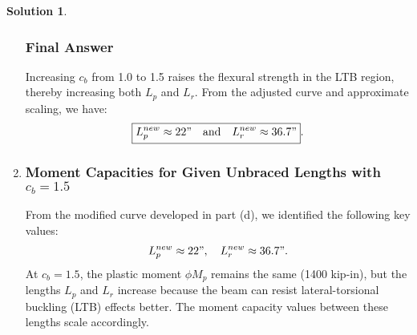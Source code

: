 \documentclass[12pt]{article}
\theoremstyle{definition} %
\newtheorem{solution}{Solution}
\theoremstyle{plain} %
\begin{document}
\begin{solution}
\begin{enumerate}
    


\subsubsection*{Final Answer}
Increasing $ c_b $ from 1.0 to 1.5 raises the flexural strength in the LTB region, thereby increasing both $ L_p $ and $ L_r $. From the adjusted curve and approximate scaling, we have:
\begin{align}
\boxed{L_p^{new} \approx 22" \quad\text{and}\quad L_r^{new} \approx 36.7"}.
\end{align}
\hrulefill

\item 
\subsubsection*{Moment Capacities for Given Unbraced Lengths with $ c_b = 1.5 $}

From the modified curve developed in part (d), we identified the following key values:
\begin{align}
L_p^{new} \approx 22", \quad L_r^{new} \approx 36.7".
\end{align}
At $ c_b = 1.5 $, the plastic moment $\phi M_p$ remains the same (1400 kip-in), but the lengths $L_p$ and $L_r$ increase because the beam can resist lateral-torsional buckling (LTB) effects better. The moment capacity values between these lengths scale accordingly.


\end{enumerate}
\end{solution}
\end{document}
